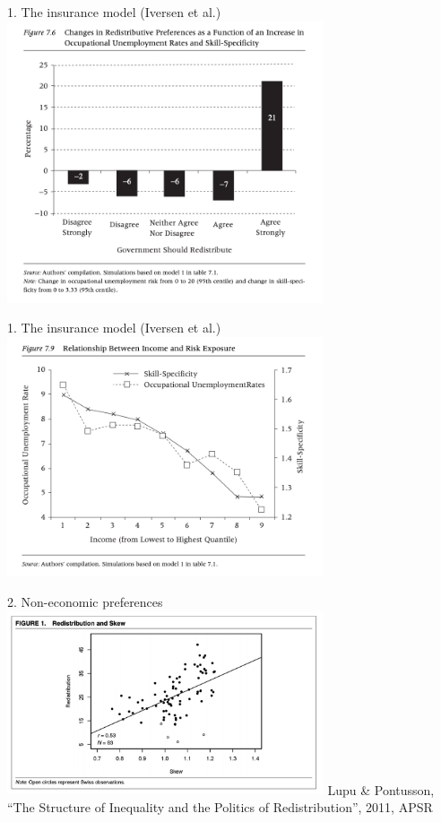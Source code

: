 \documentclass[aspectratio=169]{beamer}
\begin{document}
\begin{frame}{1. The insurance model (Iversen et al.)}
\centering
\includegraphics[width=0.7\textwidth]{insurance_2.png}
\end{frame}
\begin{frame}{1. The insurance model (Iversen et al.)}
\centering
\includegraphics[width=0.7\textwidth]{insurance_3.png}
\end{frame}

\begin{frame}{2. Non-economic preferences}
\centering
\includegraphics[width=0.7\textwidth]{lupu.png}
\footnotesize \newline  Lupu \& Pontusson, ``The Structure of Inequality and the Politics of Redistribution'', 2011, APSR
\end{frame}
\end{document}
